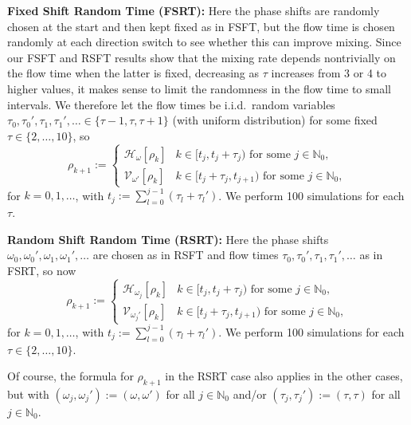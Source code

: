 \documentclass[12pt]{article}
\numberwithin{figure}{section}
\numberwithin{equation}{section}
\newcommand{\bbN}{{\mathbb{N}}}
\newcommand{\calH}{{\mathcal{H}}}
\newcommand{\calV}{{\mathcal{V}}}
\begin{document}
\medskip\noindent
\textbf{Fixed Shift Random Time (FSRT):} 
Here the phase shifts are randomly chosen at the start and then kept fixed as in FSFT, but the flow time  is chosen randomly at each direction switch to see whether this can improve mixing. Since our FSFT and RSFT results show that the mixing rate depends nontrivially on the flow time when the latter is fixed, decreasing as $\tau$ increases from 3 or 4 to higher values, it makes sense to limit the randomness in the flow time to small intervals.  We therefore let the flow times be i.i.d.~random variables $\tau_0,\tau_0',\tau_1,\tau_1',\dots\in\{\tau-1,\tau,\tau+1\}$ (with uniform distribution) for some fixed $\tau\in\{2,\dots,10\}$, so
\[
\rho_{k+1}:=
\begin{cases}
\calH_{\omega}[\rho_k] & k\in [t_j,t_j+\tau_j) \text{ for some $j\in\bbN_0$}, 
\\ \calV_{\omega'}[\rho_k] & k\in [t_j+\tau_j,t_{j+1}) \text{ for some $j\in\bbN_0$}, 
\end{cases}
\]
for $k=0,1,\dots$, with $t_j:=\sum_{l=0}^{j-1}(\tau_l+\tau_l')$.  We  perform 100 simulations for each $\tau$.

\medskip\noindent
\textbf{Random Shift Random Time (RSRT):} 
Here the phase shifts $\omega_0,\omega_0', \omega_1,\omega_1',\dots$ are chosen as in RSFT and flow times $\tau_0,\tau_0',\tau_1,\tau_1',\dots$ as in FSRT, so now
\[
\rho_{k+1}:=
\begin{cases}
\calH_{\omega_j}[\rho_k] & k\in [t_j,t_j+\tau_j) \text{ for some $j\in\bbN_0$}, 
\\ \calV_{\omega_j'}[\rho_k] & k\in [t_j+\tau_j,t_{j+1}) \text{ for some $j\in\bbN_0$} ,
\end{cases}
\]
for $k=0,1,\dots$, with $t_j:=\sum_{l=0}^{j-1}(\tau_l+\tau_l')$.  We  perform 100 simulations for each $\tau\in\{2,\dots,10\}$.

\medskip
Of course, the formula for $\rho_{k+1}$ in the RSRT case also applies in the other cases, but with $(\omega_j,\omega_j'):=(\omega,\omega')$ for all $j\in\bbN_0$ and/or  $(\tau_j,\tau_j'):=(\tau,\tau)$ for all $j\in\bbN_0$.
\end{document}
